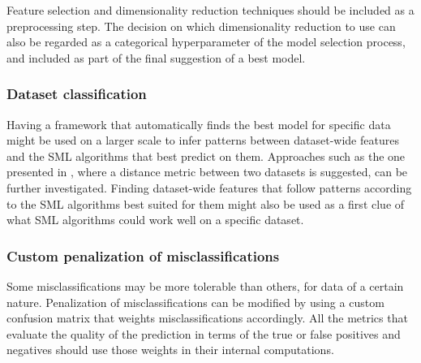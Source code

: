	Feature selection and dimensionality reduction techniques should be included as a preprocessing
	step. The decision on which dimensionality reduction to use can also be regarded as a
	categorical hyperparameter of the model selection process, and included as part of the final
	suggestion of a best model.

	\subsubsection{Dataset classification}
	Having a framework that automatically finds the best model for specific data might be used on a
	larger scale to infer patterns between dataset-wide features and the SML algorithms that best
	predict on them. Approaches such as the one presented in \cite{tatti2007distances}, where a
	distance metric between two datasets is suggested, can be further investigated. Finding
	dataset-wide features that follow patterns according to the SML algorithms best suited for them
	might also be used as a first clue of what SML algorithms could work well on a specific dataset.



	\subsubsection{Custom penalization of misclassifications}
	Some misclassifications may be more tolerable than others, for data of a certain nature.
	Penalization of misclassifications can be modified by using a custom confusion matrix that
	weights misclassifications accordingly. All the metrics that evaluate the quality of the
	prediction in terms of the true or false positives and negatives should use those weights in
	their internal computations.
